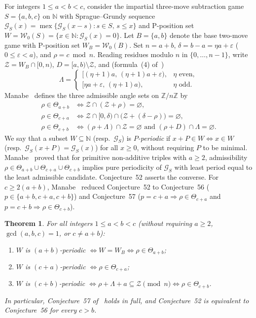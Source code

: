 \documentclass[11pt]{article}
\newtheorem{theorem}{Theorem}[section]
\theoremstyle{remark}
\DeclareMathOperator{\mex}{mex}
\begin{document}
For integers $1 \le a < b < c$, consider the impartial three-move subtraction game $S = \{a, b, c\}$ on $\mathbb{N}$ with Sprague--Grundy sequence $\mathcal{G}_S(x) = \mex\{\mathcal{G}_S(x-s) : s \in S,\, s \le x\}$ and $\mathrm{P}$-position set $W = \mathcal{W}_0(S) = \{x \in \mathbb{N} : \mathcal{G}_S(x) = 0\}$. Let $B = \{a, b\}$ denote the base two-move game with $\mathrm{P}$-position set $W_B = \mathcal{W}_0(B)$. Set $n = a + b$, $\delta = b - a = \eta a + \varepsilon$ ($0 \le \varepsilon < a$), and $\rho = c \bmod n$. Reading residues modulo $n$ in $\{0, \dots, n - 1\}$, write $\mathcal{Z} = W_B \cap [0, n)$, $D = [a, b) \setminus \mathcal{Z}$, and (formula~(4) of~\cite{Manabe2026})
\[
\Lambda = \begin{cases}
[(\eta + 1)a,\, (\eta + 1)a + \varepsilon), & \eta \text{ even}, \\
[\eta a + \varepsilon,\, (\eta + 1)a), & \eta \text{ odd}.
\end{cases}
\]
Manabe~\cite[Definition~19]{Manabe2026} defines the three admissible angle sets on $\mathbb{Z}/n\mathbb{Z}$ by
\begin{align*}
\rho \in \Theta_{a+b} &\iff \mathcal{Z} \cap (\mathcal{Z} + \rho) = \varnothing, \\
\rho \in \Theta_{c+a} &\iff \mathcal{Z} \cap [0, \delta) \cap \bigl(\mathcal{Z} + (\delta - \rho)\bigr) = \varnothing, \\
\rho \in \Theta_{c+b} &\iff (\rho + \Lambda) \cap \mathcal{Z} = \varnothing \text{ and } (\rho + D) \cap \Lambda = \varnothing.
\end{align*}
We say that a subset $W \subseteq \mathbb{N}$ (resp.\ $\mathcal{G}_S$) is \emph{$P$-periodic} if $x + P \in W \iff x \in W$ (resp.\ $\mathcal{G}_S(x + P) = \mathcal{G}_S(x)$) for all $x \ge 0$, without requiring $P$ to be minimal. Manabe~\cite[Theorem~34]{Manabe2026} proved that for primitive non-additive triples with $a \ge 2$, admissibility $\rho \in \Theta_{a+b} \cup \Theta_{c+a} \cup \Theta_{c+b}$ implies pure periodicity of $\mathcal{G}_S$ with least period equal to the least admissible candidate. Conjecture~52 asserts the converse. For $c \ge 2(a+b)$, Manabe~\cite[Proposition~59]{Manabe2026} reduced Conjecture~52 to Conjecture~56 ($p \in \{a+b, c+a, c+b\}$) and Conjecture~57 ($p = c+a \Rightarrow \rho \in \Theta_{c+a}$ and $p = c+b \Rightarrow \rho \in \Theta_{c+b}$).

\begin{theorem}\label{thm:main}
For all integers $1 \le a < b < c$ (without requiring $a \ge 2$, $\gcd(a,b,c)=1$, or $c \neq a+b$):
\begin{enumerate}
\item $W$ is $(a+b)$-periodic $\iff W = W_B \iff \rho \in \Theta_{a+b}$;
\item $W$ is $(c+a)$-periodic $\iff \rho \in \Theta_{c+a}$;
\item $W$ is $(c+b)$-periodic $\iff \rho + \Lambda + a \subseteq \mathcal{Z} \pmod{n} \iff \rho \in \Theta_{c+b}$.
\end{enumerate}
In particular, Conjecture~57 of~\cite{Manabe2026} holds in full, and Conjecture~52 is equivalent to Conjecture~56 for every $c > b$.
\end{theorem}
\end{document}

